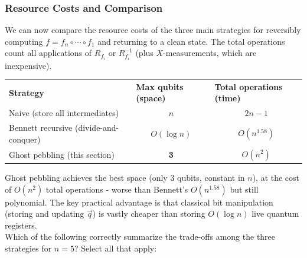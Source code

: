 \subsubsection{Resource Costs and Comparison}
We can now compare the resource costs of the three main strategies for reversibly computing $f = f_n \circ \cdots \circ f_1$  and returning to a clean state. The total operations count all applications of $R_{f_i}$ or $R_{f_i}^{-1}$ (plus $X$-measurements, which are inexpensive).
\begin{table}[!h]
\begin{tabular}{lcc}
\textbf{Strategy}                      & \multicolumn{1}{l}{\textbf{Max qubits (space)}} & \multicolumn{1}{l}{\textbf{Total operations (time)}} \\
Naive (store all intermediates)        & $n$                                             & $2n-1$                                               \\
Bennett recursive (divide-and-conquer) & $O(\log n)$                                     & $O(n^{1.58})$                                         \\
Ghost pebbling (this section)          & \textbf{3}                                      & $O(n^2)$                                            
\end{tabular}
\end{table}

Ghost pebbling achieves the best space (only 3 qubits, constant in $n$), at the cost of $O(n^2)$ total operations - worse than Bennett's $O(n^{1.58})$ but still polynomial. The key practical advantage is that classical bit manipulation (storing and updating $\vec{q}$) is vastly cheaper than storing $O(\log n)$ live quantum registers. \\

Which of the following correctly summarize the trade-offs among the three strategies for $n=5$? Select all that apply: \\
\noindent{}




